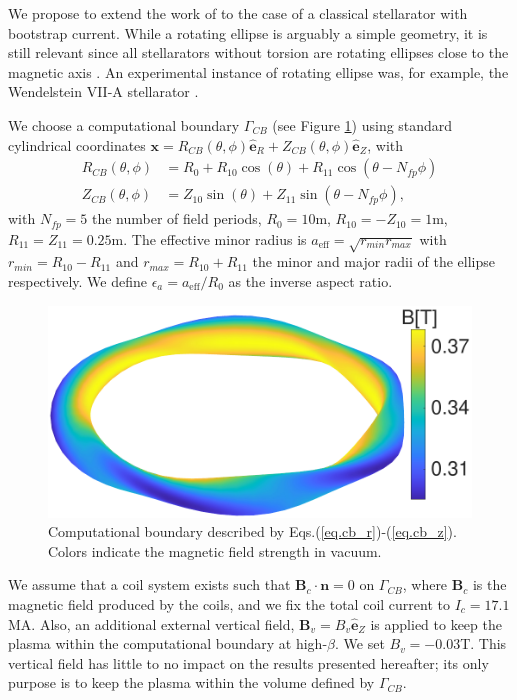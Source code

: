 \documentclass[my_thesis.tex]{subfiles}
\begin{document}
We propose to extend the work of \citet{Loizu2017} to the case of a classical stellarator with bootstrap current. While a rotating ellipse is arguably a simple geometry, it is still relevant since all stellarators without torsion are rotating ellipses close to the magnetic axis \citep{helanderTheoryPlasmaConfinement2014}. An experimental instance of rotating ellipse was, for example, the Wendelstein VII-A stellarator \citep{Grieger1985}.

We choose a computational boundary $\Gamma_{CB}$  (see Figure \ref{fig. modB boundary}) using standard cylindrical coordinates $\mathbf{x}=R_{CB}(\theta,\phi)\mathbf{\hat{e}}_R +Z_{CB}(\theta,\phi)\mathbf{\hat{e}}_Z$, with
\begin{align}
	R_{CB}(\theta,\phi) &= R_0 + R_{10}\cos(\theta) + R_{11}\cos(\theta-N_{fp}\phi)\label{eq.cb_r}\\
	Z_{CB}(\theta,\phi) &= Z_{10}\sin(\theta) + Z_{11}\sin(\theta-N_{fp}\phi)\label{eq.cb_z},
\end{align}
with $N_{fp}=5$ the number of field periods, $R_0=10$m, $R_{10}=-Z_{10}=1$m, $R_{11}=Z_{11}=0.25$m. The effective minor radius is $a_{\text{eff}}=\sqrt{r_{min}r_{max}}$ with $r_{min}=R_{10}-R_{11}$ and $r_{max}=R_{10}+R_{11}$ the minor and major radii of the ellipse respectively. We define $\epsilon_a=a_{\text{eff}}/R_0$ as the inverse aspect ratio.


\begin{figure}
	\centering
	\includegraphics[width=.7\linewidth]{images/ClassicalStellaratorBetaLimit/ComputationalBoundary_modB.pdf}
	\caption{Computational boundary described by Eqs.(\ref{eq.cb_r})-(\ref{eq.cb_z}). Colors indicate the magnetic field strength in vacuum.}
	\label{fig. modB boundary}
\end{figure}

We assume that a coil system exists such that $\mathbf{B}_c\cdot\mathbf{n}=0$ on $\Gamma_{CB}$, where $\mathbf{B}_c$ is the magnetic field produced by the coils, and we fix the total coil current to $I_c=17.1$MA.
Also, an additional external vertical field, $\mathbf{B}_v=B_v\mathbf{\hat{e}}_Z$ is applied to keep the plasma within the computational boundary at high-$\beta$. We set $B_v=-0.03$T. This vertical field has little to no impact on the results presented hereafter; its only purpose is to keep the plasma within the volume defined by $\Gamma_{CB}$. 
\end{document}
